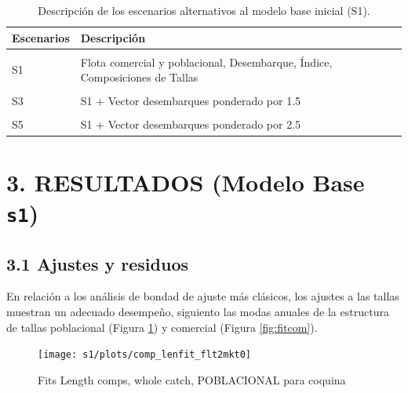 \documentclass[
]{article}
\begin{document}
\begin{table}[h!]
\centering\centering
\caption{\label{tab:unnamed-chunk-9}\label{Tab2}Descripción de los escenarios alternativos al modelo base inicial (S1).}
\centering
\fontsize{10}{12}\selectfont
\begin{tabular}[t]{ll}
\toprule
Escenarios & Descripción\\
\midrule
\cellcolor{gray!10}{S01} & \cellcolor{gray!10}{Solo Desembarque e Índice}\\
S1 & Flota comercial y poblacional, Desembarque, Índice, Composiciones de Tallas\\
\cellcolor{gray!10}{S2} & \cellcolor{gray!10}{S1 + Vector Desembarques desde 1990 asumido en 250 por año}\\
S3 & S1 + Vector desembarques ponderado por 1.5\\
\cellcolor{gray!10}{S4} & \cellcolor{gray!10}{S1 + Vector desembarques ponderado por 2}\\
\addlinespace
S5 & S1 + Vector desembarques ponderado por 2.5\\
\bottomrule
\end{tabular}
\end{table}

\pagebreak

\hypertarget{resultados-modelo-base-s1}{%
\section{\texorpdfstring{3. RESULTADOS (Modelo Base \texttt{s1})}{3. RESULTADOS (Modelo Base s1)}}\label{resultados-modelo-base-s1}}

\hypertarget{ajustes-y-residuos}{%
\subsection{3.1 Ajustes y residuos}\label{ajustes-y-residuos}}

En relación a los análisis de bondad de ajuste más clásicos, los ajustes a las tallas muestran un adecuado desempeño, siguiento las modas anuales de la estructura de tallas poblacional (Figura \ref{fig:fitpob}) y comercial (Figura \ref{fig:fitcom}).

\begin{figure}[H]

{\centering \texttt{[image: s1/plots/comp\_lenfit\_flt2mkt0]} 

}

\caption{\label{fig:fitpob}Fits Length comps, whole catch, POBLACIONAL para coquina}\label{fig:fitpob}
\end{figure}
\end{document}
